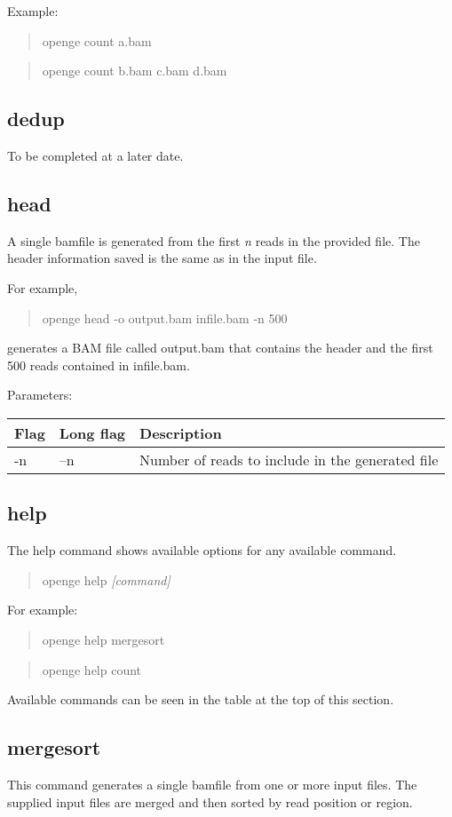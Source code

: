 \documentclass[11pt]{article}
\newcommand {\cmd}[1] {\begin{quote}#1\end{quote}}
\begin{document}
Example:
\cmd{openge count a.bam}
\cmd{openge count b.bam c.bam d.bam}

\subsection {dedup}
To be completed at a later date.

\subsection {head}
A single bamfile is generated from the first \textit{n} reads in the provided file. The header information saved is the same as in the input file.

For example,
\cmd{openge head -o output.bam infile.bam -n 500}
generates a BAM file called output.bam that contains the header and the first 500 reads contained in infile.bam.

Parameters:
\begin{center}
\begin{tabular}{llp{3.5in}}
\hline
Flag&Long flag&Description\\ \hline
-n&--n&Number of reads to include in the generated file\\
\end{tabular}
\end{center}

\subsection {help}
The help command shows available options for any available command. 

\cmd{openge help \textit{[command]}}

For example:

\cmd{openge help mergesort}

\cmd{openge help count}

Available commands can be seen in the table at the top of this section.


\subsection {mergesort}
This command generates a single bamfile from one or more input files. The supplied input files are merged and then sorted by read position or region.
\end{document}
